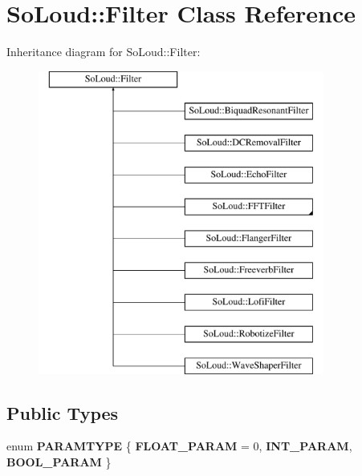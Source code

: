 \hypertarget{class_so_loud_1_1_filter}{}\section{So\+Loud\+::Filter Class Reference}
\label{class_so_loud_1_1_filter}
Inheritance diagram for So\+Loud\+::Filter\+:\begin{figure}[H]
\begin{center}
\leavevmode
\includegraphics[height=10.000000cm]{class_so_loud_1_1_filter}
\end{center}
\end{figure}
\subsection*{Public Types}
\begin{DoxyCompactItemize}
\item 
\mbox{\label{class_so_loud_1_1_filter_a0c959577717fd01952395f8a87efd4c6}} 
enum {\bfseries P\+A\+R\+A\+M\+T\+Y\+PE} \{ {\bfseries F\+L\+O\+A\+T\+\_\+\+P\+A\+R\+AM} = 0, 
{\bfseries I\+N\+T\+\_\+\+P\+A\+R\+AM}, 
{\bfseries B\+O\+O\+L\+\_\+\+P\+A\+R\+AM}
 \}
\end{DoxyCompactItemize}
